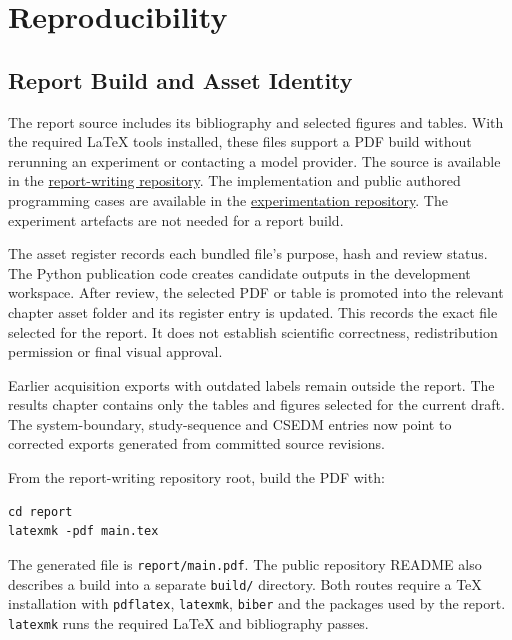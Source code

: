 \chapter{Reproducibility}
\label{app:reproducibility}

\section{Report Build and Asset Identity}

The report source includes its bibliography and selected figures and tables. With the required LaTeX tools installed, these
files support a PDF build without rerunning an experiment or contacting a model provider. The source is available in the
\href{https://github.com/thekhananas/msc-dissertation-report-writing-ak7025}{report-writing repository}. The implementation
and public authored programming cases are available in the
\href{https://github.com/thekhananas/msc-dissertation-ak7025}{experimentation repository}. The experiment artefacts are not
needed for a report build.

The asset register records each bundled file's purpose, hash and review status. The Python publication code creates candidate
outputs in the development workspace. After review, the selected PDF or table is promoted into the relevant chapter asset
folder and its register entry is updated. This records the exact file selected for the report. It does not establish scientific correctness,
redistribution permission or final visual approval.

Earlier acquisition exports with outdated labels remain outside the report. The results chapter contains only the tables and
figures selected for the current draft. The system-boundary, study-sequence and CSEDM entries now point to corrected exports
generated from committed source revisions.

From the report-writing repository root, build the PDF with:

\begin{verbatim}
cd report
latexmk -pdf main.tex
\end{verbatim}

The generated file is \texttt{report/main.pdf}. The public repository README also describes a build into a separate
\texttt{build/} directory. Both routes require a TeX installation with \texttt{pdflatex}, \texttt{latexmk}, \texttt{biber}
and the packages used by the report. \texttt{latexmk} runs the required LaTeX and bibliography passes.

